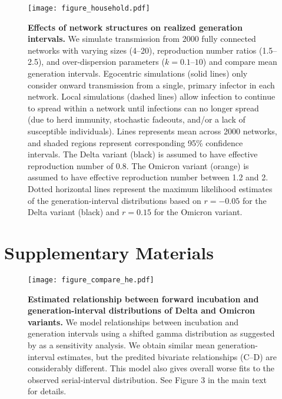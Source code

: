 \documentclass[12pt]{article}
\begin{document}
\begin{figure}[!th]
\texttt{[image: figure\_household.pdf]}
\caption{
\textbf{Effects of network structures on realized generation intervals.}
We simulate transmission from 2000 fully connected networks with varying sizes (4--20), reproduction number ratios (1.5--2.5), and over-dispersion parameters ($k=0.1$--$10$) and compare mean generation intervals.
Egocentric simulations (solid lines) only consider onward transmission from a single, primary infector in each network.
Local simulations (dashed lines) allow infection to continue to spread within a network until infections can no longer spread (due to herd immunity, stochastic fadeouts, and/or a lack of susceptible individuals).
Lines represents mean across 2000 networks, and shaded regions represent corresponding 95\% confidence intervals.
The Delta variant (black) is assumed to have effective reproduction number of 0.8.
The Omicron variant (orange) is assumed to have effective reproduction number between 1.2 and 2.
Dotted horizontal lines represent the maximum likelihood estimates of the generation-interval distributions based on $r=-0.05$ for the Delta variant (black) and $r=0.15$ for the Omicron variant.
}
\end{figure}


\pagebreak

\section*{Supplementary Materials}

\begin{figure}[!th]
\texttt{[image: figure\_compare\_he.pdf]}
\caption{
\textbf{Estimated relationship between forward incubation and generation-interval distributions of Delta and Omicron variants.}
We model relationships between incubation and generation intervals using a shifted gamma distribution as suggested by \cite{he2020temporal} as a sensitivity analysis.
We obtain similar mean generation-interval estimates, but the predited bivariate relationships (C--D) are considerably different.
This model also gives overall worse fits to the observed serial-interval distribution.
See Figure 3 in the main text for details.
}
\end{figure}


\end{document}
